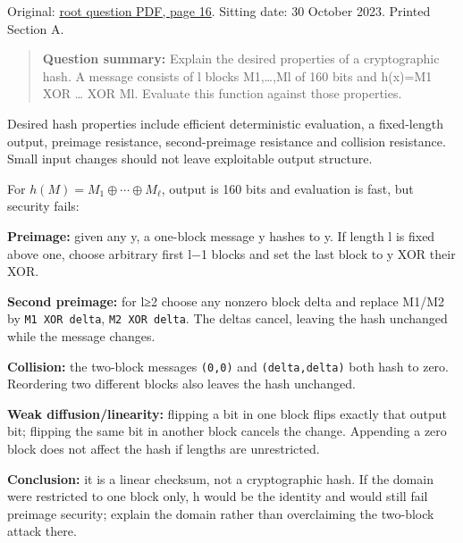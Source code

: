 \documentclass[11pt,a4paper]{article}
\begin{document}
Original: \href{../../CSE405-Security_Merged.pdf\#page=16}{root question PDF,\allowbreak{} page 16}. Sitting date: 30 October 2023. Printed Section A.



\begin{quote}\small

\textbf{Question summary:} Explain the desired properties of a cryptographic hash. A message consists of l blocks M1,\allowbreak{}…,\allowbreak{}Ml of 160 bits and h(x)=\allowbreak{}M1 XOR … XOR Ml. Evaluate this function against those properties.



\end{quote}

Desired hash properties include efficient deterministic evaluation,\allowbreak{} a fixed-length output,\allowbreak{} preimage resistance,\allowbreak{} second-preimage resistance and collision resistance. Small input changes should not leave exploitable output structure.


For \(h(M)=M_1\oplus\cdots\oplus M_\ell\),\allowbreak{} output is 160 bits and evaluation is fast,\allowbreak{} but security fails:


\textbf{Preimage:} given any y,\allowbreak{} a one-block message y hashes to y. If length l is fixed above one,\allowbreak{} choose arbitrary first l−1 blocks and set the last block to y XOR their XOR.


\textbf{Second preimage:} for l≥2 choose any nonzero block delta and replace M1/\allowbreak{}M2 by \texttt{M1 XOR delta},\allowbreak{} \texttt{M2 XOR delta}. The deltas cancel,\allowbreak{} leaving the hash unchanged while the message changes.


\textbf{Collision:} the two-block messages \texttt{(0,\allowbreak{}0)} and \texttt{(delta,\allowbreak{}delta)} both hash to zero. Reordering two different blocks also leaves the hash unchanged.


\textbf{Weak diffusion/\allowbreak{}linearity:} flipping a bit in one block flips exactly that output bit; flipping the same bit in another block cancels the change. Appending a zero block does not affect the hash if lengths are unrestricted.


\textbf{Conclusion:} it is a linear checksum,\allowbreak{} not a cryptographic hash. If the domain were restricted to one block only,\allowbreak{} h would be the identity and would still fail preimage security; explain the domain rather than overclaiming the two-block attack there.
\end{document}
